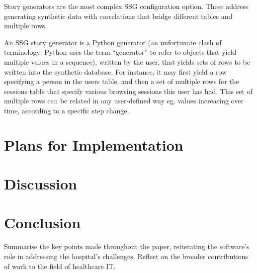 \documentclass[11pt]{article}
\begin{document}
Story generators are the most complex SSG configuration option. These address generating synthetic data with correlations that bridge different tables and multiple rows.

An SSG story generator is a Python generator (an unfortunate clash of terminology: Python uses the term “generator” to refer to objects that yield multiple values in a sequence), written by the user, that yields sets of rows to be written into the synthetic database. For instance, it may first yield a row specifying a person in the users table, and then a set of multiple rows for the sessions table that specify various browsing sessions this user has had. This set of multiple rows can be related in any user-defined way eg. values increasing over time, according to a specific step change.




\section{Plans for Implementation}


\section{Discussion}

\section{Conclusion}
Summarise the key points made throughout the paper, reiterating the software's role in addressing the hospital's challenges.
Reflect on the broader contributions of work to the field of healthcare IT.

\begin{thebibliography}{}
\end{thebibliography}
\end{document}
